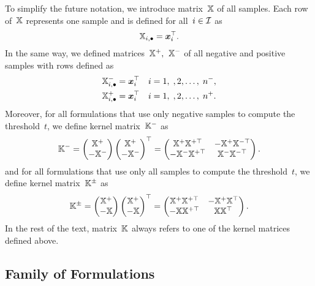 \begin{notation}\label{not: kernel matrix}
  To simplify the future notation, we introduce matrix~$\mathbb{X}$ of all samples. Each row of~$\mathbb{X}$ represents one sample and is defined for all~$i \in \mathcal{I}$ as
  \begin{equation*}
    \mathbb{X}_{i, \bullet} = \bm{x}_i^{\top}.
  \end{equation*}
  In the same way, we defined matrices~$\mathbb{X}^+,$~$\mathbb{X}^-$ of all negative and positive samples with rows defined as
  \begin{align*}
    \mathbb{X}^{-}_{i, \bullet} & = \bm{x}_i^{\top} \quad i = 1, \;, 2, \ldots, \; n^-, \\
    \mathbb{X}^{+}_{i, \bullet} & = \bm{x}_i^{\top} \quad i = 1, \;, 2, \ldots, \; n^+.
  \end{align*}
  Moreover, for all formulations that use only negative samples to compute the threshold~$t$, we define kernel matrix~$\mathbb{K}^{-}$ as
  \begin{equation*}
    \mathbb{K}^{-} = \begin{pmatrix} \mathbb{X}^+ \\ - \mathbb{X}^- \end{pmatrix} \begin{pmatrix} \mathbb{X}^+ \\ - \mathbb{X}^- \end{pmatrix}^\top = \begin{pmatrix} \mathbb{X}^+ \mathbb{X}^{+\top} & -\mathbb{X}^+ \mathbb{X}^{-\top} \\ -\mathbb{X}^- \mathbb{X}^{+\top} & \mathbb{X}^- \mathbb{X}^{-\top}  \end{pmatrix}.
  \end{equation*}
  and for all formulations that use only all samples to compute the threshold~$t$, we define kernel matrix~$\mathbb{K}^{\pm}$ as
  \begin{equation*}
    \mathbb{K}^{\pm} = \begin{pmatrix} \mathbb{X}^+ \\ - \mathbb{X} \end{pmatrix} \begin{pmatrix} \mathbb{X}^+ \\ - \mathbb{X} \end{pmatrix}^\top = \begin{pmatrix} \mathbb{X}^+ \mathbb{X}^{+\top} & -\mathbb{X}^+ \mathbb{X}^{\top} \\ -\mathbb{X} \mathbb{X}^{+\top} & \mathbb{X} \mathbb{X}^{\top}  \end{pmatrix}.
  \end{equation*}
  In the rest of the text, matrix~$\mathbb{K}$ always refers to one of the kernel matrices defined above. 
\end{notation}

\subsection{Family of \TopPushK Formulations}

